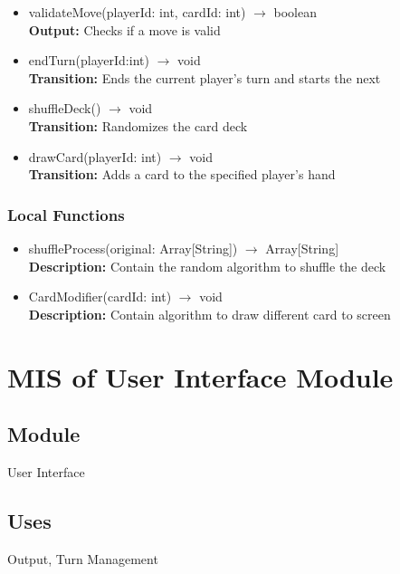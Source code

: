 \documentclass[12pt, titlepage]{article}
\begin{document}
\begin{itemize}
\item validateMove(playerId: int, cardId: int) $\rightarrow$ boolean\\
\textbf{Output:} Checks if a move is valid

\item endTurn(playerId:int) $\rightarrow$ void\\
\textbf{Transition:} Ends the current player's turn and starts the next

\item shuffleDeck() $\rightarrow$ void\\
\textbf{Transition:} Randomizes the card deck

\item drawCard(playerId: int) $\rightarrow$ void\\
\textbf{Transition:} Adds a card to the specified player’s hand

\end{itemize}


\subsubsection{Local Functions}
\begin{itemize}
\item shuffleProcess(original: Array[String]) $\rightarrow$ Array[String]\\
\textbf{Description:} Contain the random algorithm to shuffle the deck
\item CardModifier(cardId: int) $\rightarrow$ void\\
\textbf{Description:} Contain algorithm to draw different card to screen
\end{itemize}


\section{MIS of User Interface Module} 
\label{UIM}

\subsection{Module}
\hspace{1.5em}User Interface

\subsection{Uses}
\hspace{1.5em}Output, Turn Management
\end{document}
